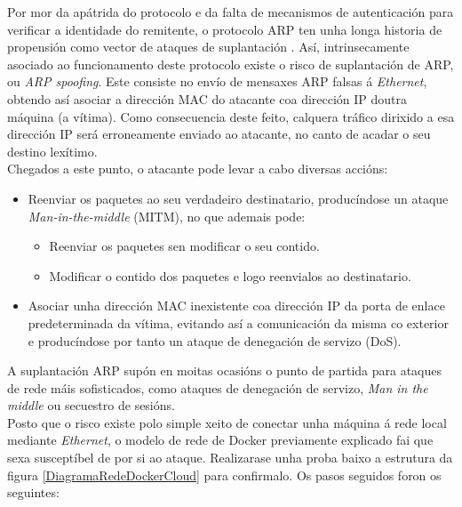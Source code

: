 Por mor da apátrida do protocolo e da falta de mecanismos de autenticación para verificar a identidade do remitente, o protocolo ARP ten unha longa historia de propensión como vector de ataques de suplantación \cite{detectingARPSpoofing}. Así, intrinsecamente asociado ao funcionamento deste protocolo existe o risco de suplantación de ARP, ou \textit{ARP spoofing}. Este consiste no envío de mensaxes ARP falsas á \textit{Ethernet}, obtendo así asociar a dirección MAC do atacante coa dirección IP doutra máquina (a vítima). Como consecuencia deste feito, calquera tráfico dirixido a esa dirección IP será erroneamente enviado ao atacante, no canto de acadar o seu destino lexítimo.\\

Chegados a este punto, o atacante pode levar a cabo diversas accións:

\begin{itemize}
\item Reenviar os paquetes ao seu verdadeiro destinatario, producíndose un ataque \textit{Man-in-the-middle} (MITM), no que ademais pode:
    \begin{itemize}
    \item Reenviar os paquetes sen modificar o seu contido.
    \item Modificar o contido dos paquetes e logo reenvialos ao destinatario.
    \end{itemize}
\item Asociar unha dirección MAC inexistente coa dirección IP da porta de enlace predeterminada da vítima, evitando así a comunicación da misma co exterior e producíndose por tanto un ataque de denegación de servizo (DoS).
\end{itemize}

A suplantación ARP supón en moitas ocasións o punto de partida para ataques de rede máis sofisticados, como ataques de denegación de servizo, \textit{Man in the middle} ou secuestro de sesións.\\

Posto que o risco existe polo simple xeito de conectar unha máquina á rede local mediante \textit{Ethernet}, o modelo de rede de Docker previamente explicado fai que sexa susceptíbel de por si ao ataque. Realizarase unha proba baixo a estrutura da figura \ref{DiagramaRedeDockerCloud} para confirmalo. Os pasos seguidos foron os seguintes:

